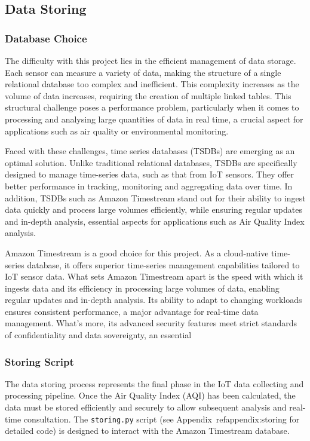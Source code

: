 \documentclass[12pt,oneside]{book} %
\begin{document}
\subsection{Data Storing}

\subsubsection{Database Choice}
The difficulty with this project lies in the efficient management of data
storage. Each sensor can measure a variety of data, making the structure of a
single relational database too complex and inefficient. This complexity
increases as the volume of data increases, requiring the creation of multiple
linked tables. This structural challenge poses a performance problem,
particularly when it comes to processing and analysing large quantities of data
in real time, a crucial aspect for applications such as air quality or
environmental monitoring.

Faced with these challenges, time series databases (TSDBs) are emerging as an
optimal solution. Unlike traditional relational databases, TSDBs are
specifically designed to manage time-series data, such as that from IoT
sensors. They offer better performance in tracking, monitoring and aggregating
data over time. In addition, TSDBs such as Amazon Timestream stand out for
their ability to ingest data quickly and process large volumes efficiently,
while ensuring regular updates and in-depth analysis, essential aspects for
applications such as Air Quality Index analysis.

Amazon Timestream is a good choice for this project. As a cloud-native
time-series database, it offers superior time-series management capabilities
tailored to IoT sensor data. What sets Amazon Timestream apart is the speed
with which it ingests data and its efficiency in processing large volumes of
data, enabling regular updates and in-depth analysis. Its ability to adapt to
changing workloads ensures consistent performance, a major advantage for
real-time data management. What's more, its advanced security features meet
strict standards of confidentiality and data sovereignty, an essential

\subsubsection{Storing Script}
The data storing process represents the final phase in the IoT data collecting
and processing pipeline. Once the Air Quality Index (AQI) has been calculated,
the data must be stored efficiently and securely to allow subsequent analysis
and real-time consultation. The \texttt{storing.py} script (see
Appendix~ref{appendix:storing} for detailed code) is designed to interact with
the Amazon Timestream database.
\end{document}

